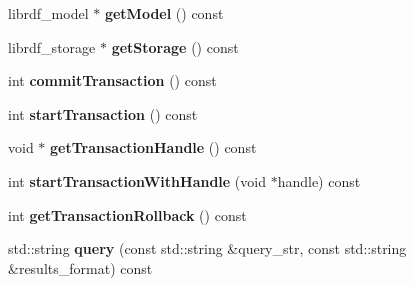 \begin{DoxyCompactItemize}
\mbox{\label{classomexmeta_1_1RDF_a8007b0ce5729c7dd3f8cab86d42216f5}} 
librdf\+\_\+model $\ast$ {\bfseries get\+Model} () const
\item 
\mbox{\label{classomexmeta_1_1RDF_a71b0e5f3b85a87c2231e7700d86060c3}} 
librdf\+\_\+storage $\ast$ {\bfseries get\+Storage} () const
\item 
\mbox{\label{classomexmeta_1_1RDF_a711f228bb86c5cbf9740f64b8633d04c}} 
int {\bfseries commit\+Transaction} () const
\item 
\mbox{\label{classomexmeta_1_1RDF_afa2b148ecb235b3ac9497fa3b528d2ed}} 
int {\bfseries start\+Transaction} () const
\item 
\mbox{\label{classomexmeta_1_1RDF_ad30bbe5c9b274713f87d4d4a5f2b28e9}} 
void $\ast$ {\bfseries get\+Transaction\+Handle} () const
\item 
\mbox{\label{classomexmeta_1_1RDF_a278b78d5b1b88397c2eb4143f23dab8b}} 
int {\bfseries start\+Transaction\+With\+Handle} (void $\ast$handle) const
\item 
\mbox{\label{classomexmeta_1_1RDF_af5c7c6104496c09762518d56e94e6048}} 
int {\bfseries get\+Transaction\+Rollback} () const
\item 
\mbox{\label{classomexmeta_1_1RDF_ab168be2c14d53c3fc94024121dc88ba6}} 
std\+::string {\bfseries query} (const std\+::string \&query\+\_\+str, const std\+::string \&results\+\_\+format) const
\end{DoxyCompactItemize}
